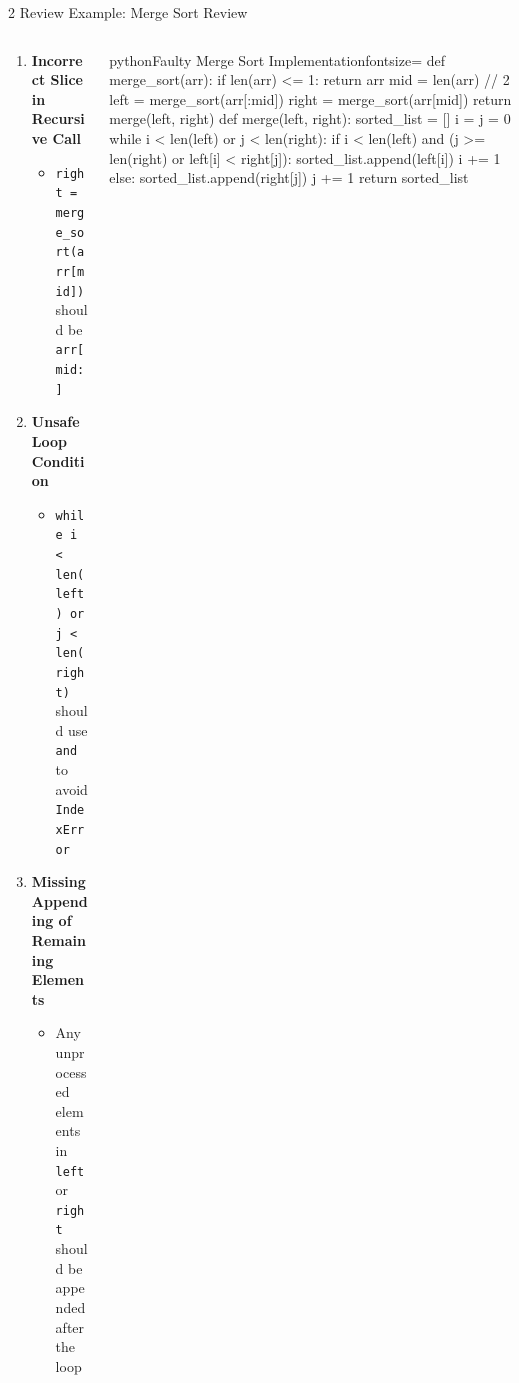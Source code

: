 \documentclass[xcolor={dvipsnames,table}, aspectratio=169]{beamer}
\begin{document}
\begin{frame}[fragile]{2 Review Example: Merge Sort Review}
  \begin{columns}[T]
    \begin{column}{0.42\textwidth}
      \begin{enumerate}
        \item \textbf{Incorrect Slice in Recursive Call}
          \begin{itemize}
            \item \texttt{right = merge\_sort(arr[mid])} should be \texttt{arr[mid:]}
          \end{itemize}
        
        \item \textbf{Unsafe Loop Condition}
          \begin{itemize}
            \item \texttt{while i < len(left) or j < len(right)} should use \texttt{and} to avoid \texttt{IndexError}
          \end{itemize}
        \item \textbf{Missing Appending of Remaining Elements}
          \begin{itemize}
            \item Any unprocessed elements in \texttt{left} or \texttt{right} should be appended after the loop
          \end{itemize}
      \end{enumerate}
    \end{column}
    
    \begin{column}{0.52\textwidth}
      \vspace{-1.5em}
      \begin{codeboxtc}{python}{Faulty Merge Sort Implementation}{}{fontsize=\scriptsize}
    def merge_sort(arr):
        if len(arr) <= 1:
            return arr
        mid = len(arr) // 2
        left = merge_sort(arr[:mid])
        right = merge_sort(arr[mid]) 
        return merge(left, right)
    def merge(left, right):
        sorted_list = []
        i = j = 0
        while i < len(left) or j < len(right):          
            if i < len(left) and (j >= len(right) or left[i] < right[j]):
                sorted_list.append(left[i])
                i += 1
            else:
                sorted_list.append(right[j])
                j += 1
        return sorted_list\end{codeboxtc}
    \end{column}
  \end{columns}
\end{frame}
\end{document}
